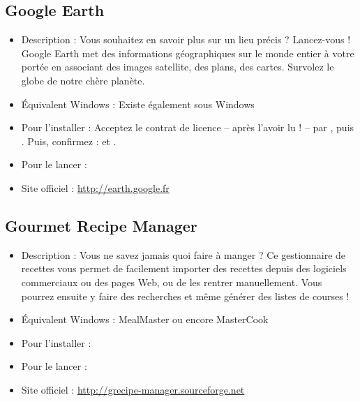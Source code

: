 \subsection{Google Earth}
\begin{itemize}
\begingroup
{}
\item Description : Vous souhaitez en savoir plus sur un lieu précis ? Lancez-vous ! Google Earth met des informations géographiques sur le monde entier à votre portée en associant des images satellite, des plans, des cartes. Survolez le globe de notre chère planète.{\par}
\endgroup
\item Équivalent Windows : Existe également sous Windows{\par}
\item Pour l'installer :  Acceptez le contrat de licence -- après l'avoir lu ! -- par , puis . Puis, confirmez : \Touche{$\leftarrow$} et .{\par}
\item Pour le lancer : 
\item Site officiel : \url{http://earth.google.fr}{\par}
\end{itemize}
\newpage
\subsection{Gourmet Recipe Manager}
\begin{itemize}
\begingroup
{}
\item Description : Vous ne savez jamais quoi faire à manger ? Ce gestionnaire de recettes vous permet de facilement importer des recettes depuis des logiciels commerciaux ou des pages Web, ou de les rentrer manuellement. Vous pourrez ensuite y faire des recherches et même générer des listes de courses !{\par}
\endgroup
\item Équivalent Windows : MealMaster ou encore MasterCook{\par}
\item Pour l'installer : 
\item Pour le lancer : 
\item Site officiel : \url{http://grecipe-manager.sourceforge.net}{\par}
\end{itemize}
